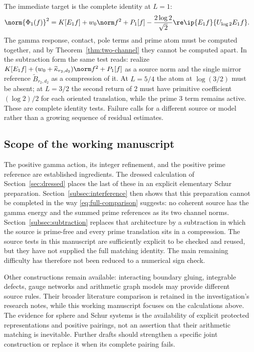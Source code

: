 The immediate target is the complete identity at $L=1$:
\begin{equation}\label{eq:first-target}
 \norm{\Phi_1(f)}^2=K[E_1f]+w_0\norm f^2+P_1[f]
 -\frac{2\log2}{\sqrt2}\re\ip{E_1f}{U_{\log2}E_1f}.
\end{equation}
The gamma response, contact, pole terms and prime atom must be computed
together, and by Theorem~\ref{thm:two-channel} they cannot be computed
apart. In the subtraction form the same test reads: realize
$K[E_1f]+(w_0+\widetilde\kappa_{r_2,d_2})\norm f^2+P_1[f]$ as a source
norm and the single mirror reference $\widetilde B_{r_2,d_2}$ as a
compression of it. At $L=5/4$ the atom at $\log(3/2)$ must be absent; at $L=3/2$
the second return of $2$ must have primitive coefficient $(\log2)/2$
for each oriented translation, while the prime $3$ term remains active.
These are complete identity tests. Failure calls for a different source
or model rather than a growing sequence of residual estimates.

\subsection{Scope of the working manuscript}
The positive gamma action, its integer refinement, and the positive
prime reference are established ingredients. The dressed calculation of
Section~\ref{sec:dressed} places the last of these in an explicit elementary
Schur preparation. Section~\ref{subsec:interference} then shows that this
preparation cannot be completed in the way \eqref{eq:full-comparison}
suggests: no coherent source has the gamma energy and the summed prime
references as its two channel norms. Section~\ref{subsec:subtraction}
replaces that architecture by a subtraction in which the source is prime-free
and every prime translation sits in a compression. The source tests in this manuscript are
sufficiently explicit to be checked and reused, but they have not supplied
the full matching identity. The main remaining difficulty has therefore not
been reduced to a numerical sign check.

Other constructions remain available: interacting boundary gluing,
integrable defects, gauge networks and arithmetic graph models may
provide different source rules. Their broader literature comparison
is retained in the investigation's research notes, while this working
manuscript focuses on the calculations above. The evidence for sphere
and Schur systems is the availability of explicit protected
representations and positive pairings, not an assertion that their
arithmetic matching is inevitable. Further drafts should strengthen a
specific joint construction or replace it when its complete pairing fails.
